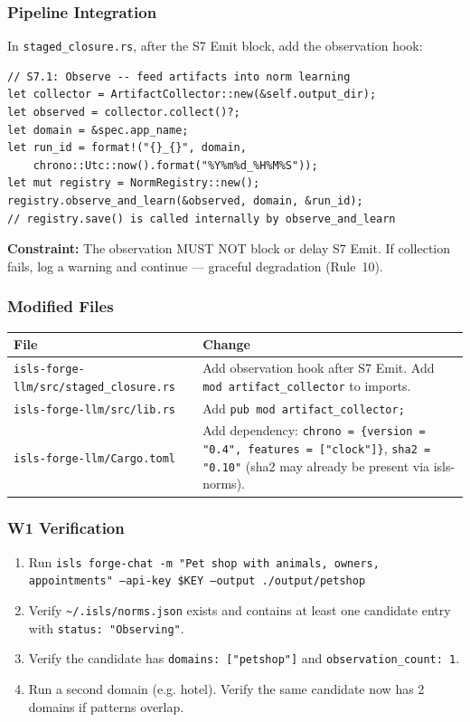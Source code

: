 \documentclass[11pt,a4paper]{article}
\begin{document}
\subsubsection{Pipeline Integration}

In \texttt{staged\_closure.rs}, after the S7 Emit block, add the 
observation hook:

\begin{lstlisting}[style=rust]
// S7.1: Observe -- feed artifacts into norm learning
let collector = ArtifactCollector::new(&self.output_dir);
let observed = collector.collect()?;
let domain = &spec.app_name;
let run_id = format!("{}_{}", domain,
    chrono::Utc::now().format("%Y%m%d_%H%M%S"));
let mut registry = NormRegistry::new();
registry.observe_and_learn(&observed, domain, &run_id);
// registry.save() is called internally by observe_and_learn
\end{lstlisting}

\textbf{Constraint:} The observation MUST NOT block or delay S7 Emit. 
If collection fails, log a warning and continue --- graceful degradation 
(Rule~10).

\subsubsection{Modified Files}

\begin{longtable}{lp{10cm}}
\toprule
\textbf{File} & \textbf{Change} \\
\midrule
\texttt{isls-forge-llm/src/staged\_closure.rs}
  & Add observation hook after S7 Emit. Add \texttt{mod artifact\_collector} 
    to imports. \\
\texttt{isls-forge-llm/src/lib.rs}
  & Add \texttt{pub mod artifact\_collector;} \\
\texttt{isls-forge-llm/Cargo.toml}
  & Add dependency: \texttt{chrono = \{version = "0.4", 
    features = ["clock"]\}}, \texttt{sha2 = "0.10"} 
    (sha2 may already be present via isls-norms). \\
\bottomrule
\end{longtable}

\subsubsection{W1 Verification}

\begin{enumerate}[nosep]
\item Run \texttt{isls forge-chat -m "Pet shop with animals, owners, 
      appointments" --api-key \$KEY --output ./output/petshop}
\item Verify \texttt{\textasciitilde/.isls/norms.json} exists and contains 
      at least one candidate entry with \texttt{status: "Observing"}.
\item Verify the candidate has \texttt{domains: ["petshop"]} and 
      \texttt{observation\_count: 1}.
\item Run a second domain (e.g. hotel). Verify the same candidate now has 
      2 domains if patterns overlap.
\end{enumerate}
\end{document}
